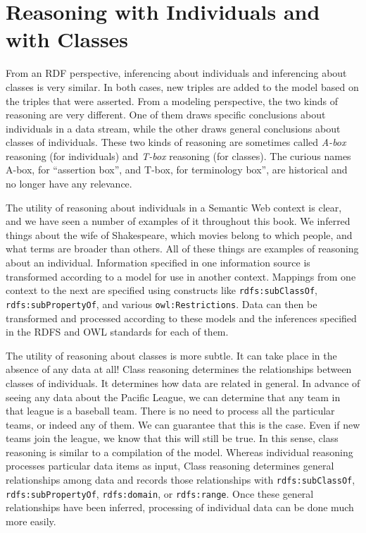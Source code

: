 \section{Reasoning with Individuals and with Classes}

From an RDF perspective, inferencing about individuals and inferencing
about classes is very similar. In both cases, new triples are added to
the model based on the triples that were asserted. From a modeling
perspective, the two kinds of reasoning are very different. One of them
draws specific conclusions about individuals in a data stream, while the
other draws general conclusions about classes of individuals. These two
kinds of reasoning are sometimes called \emph{A-box} reasoning (for individuals)
and \emph{T-box} reasoning (for classes). The curious names A-box, for
``assertion box'', and T-box, for terminology box'', are historical and
no longer have any relevance.

The utility of reasoning about individuals in a Semantic Web context is
clear, and we have seen a number of examples of it throughout this book.
We inferred things about the wife of Shakespeare, which movies belong to
which people, and what terms are broader than others. All of these
things are examples of reasoning about an individual. Information
specified in one information source is transformed according to a model
for use in another context. Mappings from one context to the next are
specified using constructs like \texttt{rdfs:subClassOf}, \texttt{rdfs:subPropertyOf}, and
various \texttt{owl:Restrictions}. Data can then be transformed and processed
according to these models and the inferences specified in the RDFS and
OWL standards for each of them.

The utility of reasoning about classes is more subtle. It can take place
in the absence of any data at all! Class reasoning determines the
relationships between classes of individuals. It determines how data are
related in general. In advance of seeing any data about the Pacific
League, we can determine that any team in that league is a baseball
team. There is no need to process all the particular teams, or indeed
any of them. We can guarantee that this is the case. Even if new teams
join the league, we know that this will still be true. In this sense,
class reasoning is similar to a compilation of the model. Whereas
individual reasoning processes particular data items as input, Class
reasoning determines general relationships among data and records those
relationships with \texttt{rdfs:subClassOf}, \texttt{rdfs:subPropertyOf}, \texttt{rdfs:domain}, or
\texttt{rdfs:range}. Once these general relationships have been inferred,
processing of individual data can be done much more easily.

